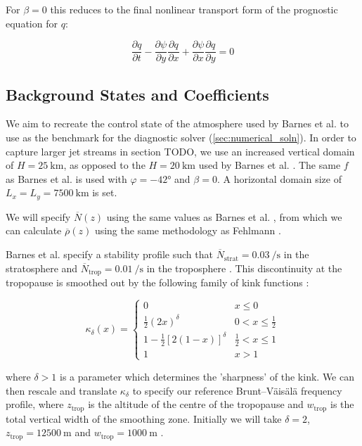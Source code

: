 \documentclass{article}
\begin{document}
For $\beta=0$ this reduces to the final nonlinear transport form of the prognostic equation for $q$:

\begin{equation}\label{qgpv_time}
    \boxed{\frac{\partial q}{\partial t} - \frac{\partial \psi}{\partial y} \frac{\partial q}{\partial x} + \frac{\partial \psi}{\partial x} \frac{\partial q}{\partial y} = 0}
\end{equation}

\subsection{Background States and Coefficients}
We aim to recreate the control state of the atmosphere used by Barnes et al. to use as the benchmark for the diagnostic solver (\cref{sec:numerical_soln}).
In order to capture larger jet streams in section TODO, we use an increased vertical domain of $H=\qty{25}{\kilo \meter}$, as opposed to the $H=\qty{20}{\kilo \meter}$ used by Barnes et al. \cite{Barnes2022main}.
The same $f$ as Barnes et al. is used with $\varphi = \ang{-42}$ and $\beta=0$.
A horizontal domain size of $L_x = L_y = \qty{7500}{\kilo \meter}$ is set.

We will specify $\overline{N}(z)$ using the same values as Barnes et al. \cite{Barnes2022main}, from which we can calculate $\overline{\rho}(z)$ using the same methodology as Fehlmann \cite{fehlmann1997pvelements}.

Barnes et al. specify a stability profile such that $\overline N_\text{strat} = \qty{0.03}{\per\second}$ in the stratosphere and $\overline N_\text{trop} = \qty{0.01}{\per\second}$ in the troposphere \cite{Barnes2022main}.
This discontinuity at the tropopause is smoothed out by the following family of kink functions \cite{fehlmann1997pvelements}:

\begin{equation}\label{kappa_delta}
    \kappa_\delta (x) = \begin{cases}
        0 & x \leq 0 \\
        \frac12 (2x)^\delta & 0 < x \leq\frac12 \\
        1-\frac12 [2(1-x)]^\delta & \frac12 < x \leq 1 \\
        1  & x>1
    \end{cases}
\end{equation}

where $\delta >1$ is a parameter which determines the 'sharpness' of the kink.
We can then rescale and translate $\kappa_\delta$ to specify our reference Brunt–Väisälä frequency profile, where $z_\text{trop}$ is the altitude of the centre of the tropopause and $w_\text{trop}$ is the total vertical width of the smoothing zone.
Initially we will take $\delta = 2$, $z_\text{trop}=\qty{12500}{\meter}$ \cite{Barnes2022main} and $w_\text{trop}=\qty{1000}{\meter}$ \cite{fehlmann1997pvelements}.
\end{document}
